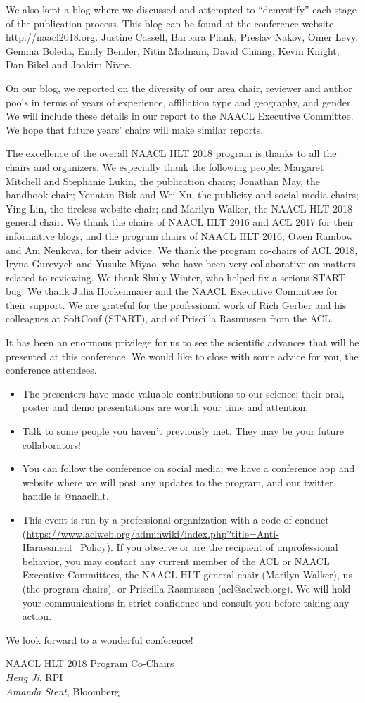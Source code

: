 We also kept a blog where we discussed and attempted to ``demystify'' each stage of the publication process. This blog can be found at the conference website, {\small \url{http://naacl2018.org}}. Justine Cassell, Barbara Plank, Preslav Nakov, Omer Levy, Gemma Boleda, Emily Bender, Nitin Madnani, David Chiang, Kevin Knight, Dan Bikel and Joakim
Nivre.

On our blog, we reported on the diversity of our area chair,  reviewer and author pools in terms of years of experience, affiliation type and geography, and gender. We will include these details in our report to the NAACL Executive Committee. We hope that future years' chairs will make similar reports.

The excellence of the overall NAACL HLT 2018 program is thanks to all the chairs and organizers. We especially thank the following people: Margaret Mitchell and Stephanie Lukin, the publication chairs; Jonathan May, the handbook chair; Yonatan Bisk and Wei Xu, the publicity and social media chairs; Ying Lin, the tireless website chair; and Marilyn Walker, the NAACL HLT 2018 general chair. We thank the chairs of NAACL HLT 2016 and ACL 2017 for their informative blogs, and the program chairs of NAACL HLT 2016, Owen Rambow and Ani Nenkova, for their advice. We thank the program co-chairs of ACL 2018, Iryna Gurevych and Yusuke Miyao, who have been very collaborative on matters related to reviewing. We thank Shuly Winter, who helped fix a serious START bug. We thank Julia Hockenmaier and the NAACL Executive Committee for their support.  We are grateful for the professional work of Rich Gerber and his colleagues at SoftConf (START), and  of Priscilla Rasmussen from the ACL. 

It has been an enormous privilege for us to see the scientific advances that will be presented at this conference. We would like to close with some advice for you, the conference attendees.  %
\begin{itemize}[noitemsep,nolistsep]
\item The presenters have made valuable contributions to our science; their oral, poster and demo presentations are worth your time and attention.
\item Talk to some people you haven't previously met. They may be your   future collaborators!
\item You can follow the conference on social media; we have a conference app and website where we will post any updates to the program, and our twitter handle is @naaclhlt. 
\item This event is run by a professional organization with a code of conduct ({\small \url{https://www.aclweb.org/adminwiki/index.php?title=Anti-Harassment_Policy}}). If you observe or are the recipient of unprofessional behavior, you may contact  any current member of the ACL or NAACL Executive Committees, the NAACL HLT general chair (Marilyn Walker), us (the program chairs), or Priscilla Rasmussen (acl@aclweb.org). We will hold your communications in strict confidence and consult you before taking any action.
\end{itemize}

We look forward to a wonderful conference! 

\vskip 0.5in
\noindent NAACL HLT 2018 Program Co-Chairs \\
{\it Heng Ji}, RPI \\
{\it Amanda Stent}, Bloomberg
